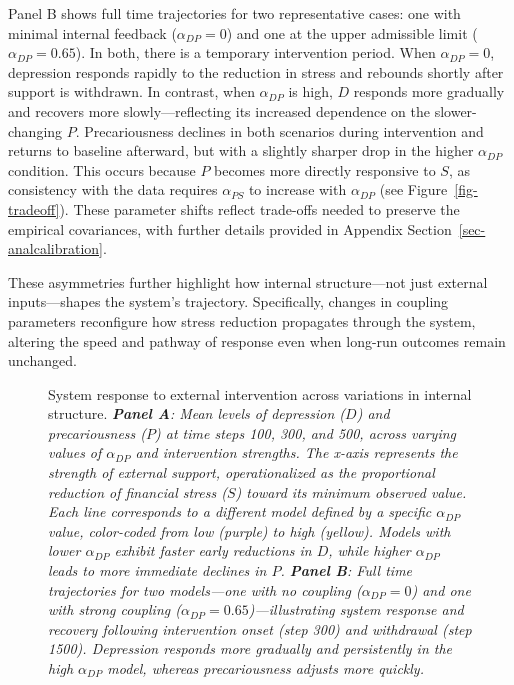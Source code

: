 \documentclass[
]{article}
\begin{document}
Panel B shows full time trajectories for two representative cases: one
with minimal internal feedback (\(\alpha_{DP} = 0\)) and one at the
upper admissible limit (\(\alpha_{DP} = 0.65\)). In both, there is a
temporary intervention period. When \(\alpha_{DP} = 0\), depression
responds rapidly to the reduction in stress and rebounds shortly after
support is withdrawn. In contrast, when \(\alpha_{DP}\) is high, \(D\)
responds more gradually and recovers more slowly---reflecting its
increased dependence on the slower-changing \(P\). Precariousness
declines in both scenarios during intervention and returns to baseline
afterward, but with a slightly sharper drop in the higher
\(\alpha_{DP}\) condition. This occurs because \(P\) becomes more
directly responsive to \(S\), as consistency with the data requires
\(\alpha_{PS}\) to increase with \(\alpha_{DP}\) (see
Figure~\ref{fig-tradeoff}). These parameter shifts reflect trade-offs
needed to preserve the empirical covariances, with further details
provided in Appendix Section~\ref{sec-analcalibration}.

These asymmetries further highlight how internal structure---not just
external inputs---shapes the system's trajectory. Specifically, changes
in coupling parameters reconfigure how stress reduction propagates
through the system, altering the speed and pathway of response even when
long-run outcomes remain unchanged.

\begin{figure}


\caption{\label{fig-intervention}System response to external
intervention across variations in internal structure.
\emph{\textbf{Panel A}: Mean levels of depression (\(D\)) and
precariousness (\(P\)) at time steps 100, 300, and 500, across varying
values of \(\alpha_{DP}\) and intervention strengths. The x-axis
represents the strength of external support, operationalized as the
proportional reduction of financial stress (\(S\)) toward its minimum
observed value. Each line corresponds to a different model defined by a
specific \(\alpha_{DP}\) value, color-coded from low (purple) to high
(yellow). Models with lower \(\alpha_{DP}\) exhibit faster early
reductions in \(D\), while higher \(\alpha_{DP}\) leads to more
immediate declines in \(P\). \textbf{Panel B}: Full time trajectories
for two models---one with no coupling (\(\alpha_{DP} = 0\)) and one with
strong coupling (\(\alpha_{DP} = 0.65\))---illustrating system response
and recovery following intervention onset (step 300) and withdrawal
(step 1500). Depression responds more gradually and persistently in the
high \(\alpha_{DP}\) model, whereas precariousness adjusts more
quickly.}}

\end{figure}%
\end{document}
